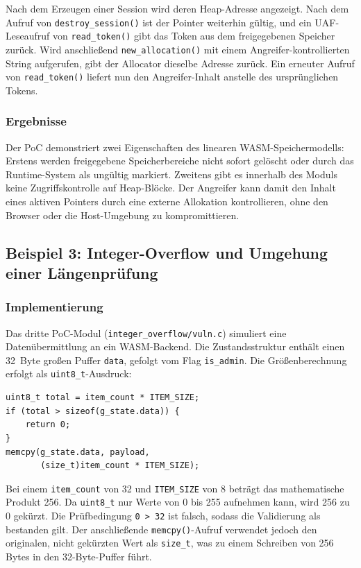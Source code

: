 Nach dem Erzeugen einer Session wird deren Heap-Adresse angezeigt. Nach dem Aufruf von \texttt{destroy\_session()} ist der Pointer weiterhin gültig, und ein UAF-Leseaufruf von \texttt{read\_token()} gibt das Token aus dem freigegebenen Speicher zurück. Wird anschließend \texttt{new\_allocation()} mit einem Angreifer-kontrollierten String aufgerufen, gibt der Allocator dieselbe Adresse zurück. Ein erneuter Aufruf von \texttt{read\_token()} liefert nun den Angreifer-Inhalt anstelle des ursprünglichen Tokens.

\subsubsection{Ergebnisse}

Der PoC demonstriert zwei Eigenschaften des linearen WASM-Speichermodells: Erstens werden freigegebene Speicherbereiche nicht sofort gelöscht oder durch das Runtime-System als ungültig markiert. Zweitens gibt es innerhalb des Moduls keine Zugriffskontrolle auf Heap-Blöcke. Der Angreifer kann damit den Inhalt eines aktiven Pointers durch eine externe Allokation kontrollieren, ohne den Browser oder die Host-Umgebung zu kompromittieren.

\subsection{Beispiel 3: Integer-Overflow und Umgehung einer Längenprüfung}

\subsubsection{Implementierung}

Das dritte PoC-Modul (\texttt{integer\_overflow/vuln.c}) simuliert eine Datenübermittlung an ein WASM-Backend. Die Zustandsstruktur enthält einen 32~Byte großen Puffer \texttt{data}, gefolgt vom Flag \texttt{is\_admin}. Die Größenberechnung erfolgt als \texttt{uint8\_t}-Ausdruck:

\begin{verbatim}
uint8_t total = item_count * ITEM_SIZE;
if (total > sizeof(g_state.data)) {
    return 0;
}
memcpy(g_state.data, payload,
       (size_t)item_count * ITEM_SIZE);
\end{verbatim}

Bei einem \texttt{item\_count} von 32 und \texttt{ITEM\_SIZE} von 8 beträgt das mathematische Produkt 256. Da \texttt{uint8\_t} nur Werte von 0 bis 255 aufnehmen kann, wird 256 zu 0 gekürzt. Die Prüfbedingung \texttt{0 > 32} ist falsch, sodass die Validierung als bestanden gilt. Der anschließende \texttt{memcpy()}-Aufruf verwendet jedoch den originalen, nicht gekürzten Wert als \texttt{size\_t}, was zu einem Schreiben von 256 Bytes in den 32-Byte-Puffer führt.

